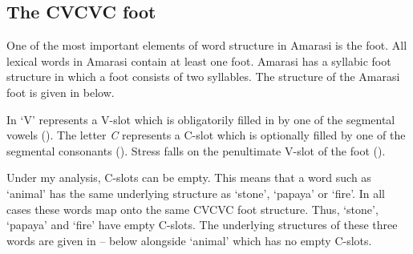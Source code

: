 \subsection{The CVCVC foot}\label{sec:TheFoo}
One of the most important elements of word structure in Amarasi is the foot.
All lexical words in Amarasi contain at least one foot.
Amarasi has a syllabic foot structure in which a foot consists of two syllables.
The structure of the Amarasi foot is given in  below.

\begin{exe}
	\label{ex:Ft->CVCVC}
\end{exe}

In  `V' represents a V-slot
which is obligatorily filled in by one of the segmental vowels ().
The letter \emph{C} represents a C-slot which is optionally
filled by one of the segmental consonants ().
Stress falls on the penultimate V-slot of the foot ().

Under my analysis, C-slots can be empty.
This means that a word such as  `animal'
has the same underlying structure as  `stone',  `papaya' or  `fire'.
In all cases these words map onto the same CVCVC foot structure.
Thus,  `stone',  `papaya'  and  `fire' have empty C-slots.
The underlying structures of these three words
are given in -- below
alongside  `animal' which has no empty C-slots.

